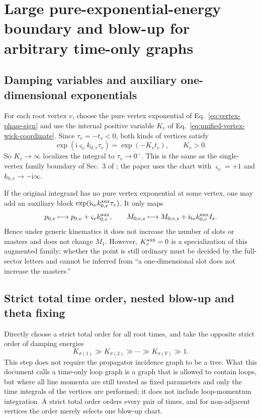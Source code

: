 \documentclass[11pt,a4paper]{article}
\newcommand{\ii}{\mathrm i}
\begin{document}
\section{Large pure-exponential-energy boundary and blow-up for arbitrary time-only graphs}
\label{sec:boundary-blowup}

\subsection{Damping variables and auxiliary one-dimensional exponentials}

For each root vertex $v$, choose the pure vertex exponential of Eq.~\eqref{eq:vertex-phase-sign} and use the internal positive variable $K_v$ of Eq.~\eqref{eq:unified-vertex-wick-coordinate}. Since $\tau_v=-t_v<0$, both kinds of vertices satisfy
\begin{equation}
 \exp(\ii\varsigma_vk_{0,v}\tau_v)=\exp(-K_vt_v),
 \qquad K_v>0.
 \label{eq:wick-damping-energy}
\end{equation}
So $K_v\to\infty$ localizes the integral to $\tau_v\to0^-$. This is the same as the single-vertex family boundary of Sec.~3 of \cite{Chen:2024jms}; the paper uses the chart with $\varsigma_v=+1$ and $k_{0,v}\to-\ii\infty$.

If the original integrand has no pure vertex exponential at some vertex, one may add an auxiliary block $\exp(\ii\varsigma_vk_{0,v}^{\rm aux}\tau_v)$. It only maps
\begin{equation}
 p_{0,v}\longmapsto p_{0,v}+\varsigma_vk_{0,v}^{\rm aux},
 \qquad
 M_{0;v,s}\longmapsto M_{0;v,s}
 +\ii\varsigma_vk_{0,v}^{\rm aux}I_s .
 \label{eq:auxiliary-energy-M0-shift}
\end{equation}
Hence under generic kinematics it does not increase the number of slots or masters and does not change $M_1$. However, $K_v^{\rm aux}=0$ is a specialization of this augmented family; whether the point is still ordinary must be decided by the full-sector letters and cannot be inferred from ``a one-dimensional slot does not increase the masters.''

\subsection{Strict total time order, nested blow-up and theta fixing}

Directly choose a strict total order for all root times, and take the opposite strict order of damping energies
\begin{equation}
 K_{\sigma(1)}\gg K_{\sigma(2)}\gg\cdots
 \gg K_{\sigma(V)}\gg1.
 \label{eq:strict-energy-rank}
\end{equation}
This step does not require the propagator incidence graph to be a tree. What this document calls a time-only loop graph is a graph that is allowed to contain loops, but where all line momenta are still treated as fixed parameters and only the time integrals of the vertices are performed; it does not include loop-momentum integration. A strict total order orders every pair of times, and for non-adjacent vertices the order merely selects one blow-up chart.
\end{document}
